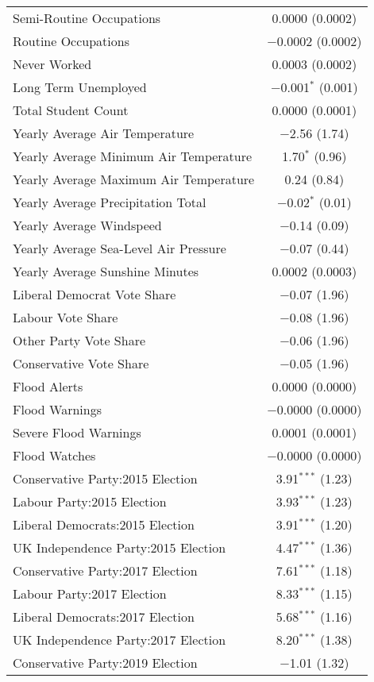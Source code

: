 \documentclass[12pt,letterpaper]{article}
\begin{document}
\begin{table}[H]
\begin{tabular}{@{\extracolsep{5pt}}lc}
		Semi-Routine Occupations & 0.0000 (0.0002) \\ 
		Routine Occupations & $-$0.0002 (0.0002) \\ 
		Never Worked & 0.0003 (0.0002) \\ 
		Long Term Unemployed & $-$0.001$^{*}$ (0.001) \\ 
		Total Student Count & 0.0000 (0.0001) \\ 
		Yearly Average Air Temperature & $-$2.56 (1.74) \\ 
		Yearly Average Minimum Air Temperature & 1.70$^{*}$ (0.96) \\ 
		Yearly Average Maximum Air Temperature & 0.24 (0.84) \\ 
		Yearly Average Precipitation Total & $-$0.02$^{*}$ (0.01) \\ 
		Yearly Average Windspeed & $-$0.14 (0.09) \\ 
		Yearly Average  Sea-Level Air Pressure & $-$0.07 (0.44) \\ 
		Yearly Average Sunshine Minutes & 0.0002 (0.0003) \\ 
		Liberal Democrat Vote Share & $-$0.07 (1.96) \\ 
		Labour Vote Share & $-$0.08 (1.96) \\ 
		Other Party Vote Share & $-$0.06 (1.96) \\ 
		Conservative Vote Share & $-$0.05 (1.96) \\ 
		Flood Alerts & 0.0000 (0.0000) \\ 
		Flood Warnings & $-$0.0000 (0.0000) \\ 
		Severe Flood Warnings & 0.0001 (0.0001) \\ 
		Flood Watches & $-$0.0000 (0.0000) \\ 
		Conservative Party:2015 Election & 3.91$^{***}$ (1.23) \\ 
		Labour Party:2015 Election& 3.93$^{***}$ (1.23) \\ 
		Liberal Democrats:2015 Election & 3.91$^{***}$ (1.20) \\ 
		UK Independence Party:2015 Election & 4.47$^{***}$ (1.36) \\ 
		Conservative Party:2017 Election & 7.61$^{***}$ (1.18) \\ 
		Labour Party:2017 Election & 8.33$^{***}$ (1.15) \\ 
		Liberal Democrats:2017 Election & 5.68$^{***}$ (1.16) \\ 
		UK Independence Party:2017 Election & 8.20$^{***}$ (1.38) \\ 
		Conservative Party:2019 Election & $-$1.01 (1.32) \\ 

\end{tabular}
\end{table}
\end{document}
